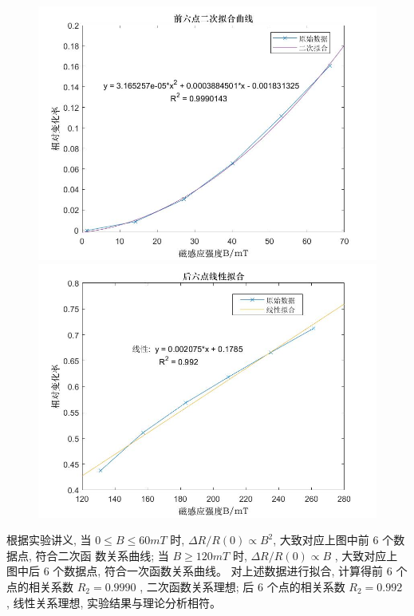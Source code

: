 \documentclass[UTF8]{ctexart}
\begin{document}
\begin{figure}[htbp]
	\centering
	\begin{minipage}{0.49\linewidth}
		\centering
		\includegraphics[width=0.9\linewidth]{拟合6.jpg}
	\end{minipage}
	\begin{minipage}{0.49\linewidth}
		\centering
		\includegraphics[width=0.9\linewidth]{拟合7.jpg}
	\end{minipage}
\end{figure}

根据实验讲义, 当  $0 \leq B \leq 60 m T$  时,  $\Delta R / R(0) \propto B^{2} $, 大致对应上图中前 6 个数据点, 符合二次函 数关系曲线; 当  $B \geq 120 m T$  时,  $\Delta R / R(0) \propto B$ , 大致对应上图中后 6 个数据点, 符合一次函数关系曲线。 对上述数据进行拟合, 计算得前 6 个点的相关系数  $R_{2}=0.9990$ , 二次函数关系理想; 后 6 个点的相关系数 $ R_{2}=0.992$ , 线性关系理想, 实验结果与理论分析相符。
\end{document}
